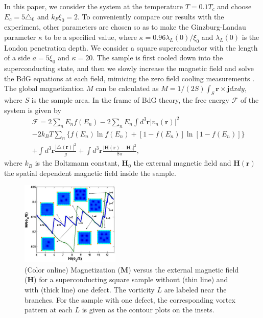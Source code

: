 \documentclass[aps,prl,showpacs,twocolumn]{revtex4}
\begin{document}
In this paper, we consider the system at the temperature $T=0.1T_c$
and choose $E_c=5\triangle_0$ and $k_F\xi_0=2$. To conveniently
compare our results with the experiment, other parameters are chosen
so as to make the Ginzburg-Landau parameter $\kappa$ to be a
specified value, where $\kappa=0.96\lambda_L(0)/\xi_0$ \cite{gennes}
and $\lambda_L(0)$ is the London penetration depth. We consider a
square superconductor with the length of a side $a=5\xi_0$ and
$\kappa=20$. The sample is first cooled down into the
superconducting state, and then we slowly increase the magnetic
field and solve the BdG equations at each field, mimicing the zero
field cooling measurements \cite{cren,nishio2}. The global
magnetization $M$ can be calculated as
$M=1/(2S)\int_S\textbf{r}\times\textbf{j} dxdy$, where $S$ is the
sample area. In the frame of BdG theory, the free energy
$\mathcal{F}$ of the system is given \cite{kosztin} by
\begin{eqnarray}
&&\mathcal{F}=2\sum_nE_nf(E_n)-2\sum_nE_n\int
d^3\textbf{r}|v_n(\textbf{r})|^2\nonumber\\
&\!\!&-2k_BT\sum_n\{f(E_n)\ln
f(E_n)+[1-f(E_n)]\ln[1-f(E_n)]\}\nonumber\\
&&+\int d^3\textbf{r}\frac{|\triangle(\textbf{r})|^2}{g}+\int
d^3\textbf{r}\frac{|\textbf{H}(\textbf{r})-\textbf{H}_0|^2}{8\pi},\nonumber
\end{eqnarray}
where $k_B$ is the Boltzmann constant, $\textbf{H}_0$ the external
magnetic field and $\textbf{H}(\textbf{r})$ the spatial dependent
magnetic field inside the sample.

\begin{figure}[tbp]
\centering
\renewcommand{\figurename}{FIG. }
\includegraphics[width=0.42\textwidth]{Fig1.eps}
\caption{(Color online) Magnetization (\textbf{M}) versus the
external magnetic field (\textbf{H}) for a superconducting square
sample without (thin line) and with (thick line) one defect. The
vorticity $L$ are labeled near the branches. For the sample with one
defect, the corresponding vortex pattern at each $L$ is given as the
contour plots on the insets.}
\end{figure}
\end{document}
